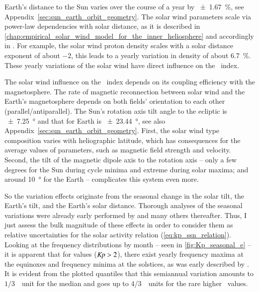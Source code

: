 Earth's distance to the Sun varies over the course of a year by \SI{+-1.67}{\percent}, see Appendix~\ref{sec:sun_earth_orbit_geometry}. The solar wind parameters scale via power-law dependencies with solar distance, as it is described in \autoref{chap:empirical_solar_wind_model_for_the_inner_heliosphere} and accordingly in \citet{Venzmer2018}. For example, the solar wind proton density scales with a solar distance exponent of about $-2$, this leads to a yearly variation in density of about \SI{6.7}{\percent}. These yearly variations of the solar wind have direct influence on the \Kp{}~index.

The solar wind influence on the \Kp{}~index depends on its coupling efficiency with the magnetosphere. The rate of magnetic reconnection between solar wind and the Earth's magnetosphere depends on both fields' orientation to each other (parallel/antiparallel). The Sun's rotation axis tilt angle to the ecliptic is \SI{+-7.25}{\degree} and that for Earth is \SI{+-23.44}{\degree}, see also Appendix~\ref{sec:sun_earth_orbit_geometry}. First, the solar wind type composition varies with heliographic latitude, which has consequences for the average values of parameters, such as magnetic field strength and velocity. Second, the tilt of the magnetic dipole axis to the rotation axis -- only a few degrees for the Sun during cycle minima and extreme during solar maxima; and around \SI{10}{\degree} for the Earth -- complicates this system even more.

So the \Kp{} variation effects originate from the seasonal change in the solar tilt, the Earth's tilt, and the Earth's solar distance. Thorough analyses of the seasonal variations were already early performed by \citet{Cortie1912} and many others thereafter. Thus, I just assess the bulk magnitude of these effects in order to consider them as relative uncertainties for the solar activity relation (\ref{eq:kp_ssn_relation}). Looking at the \Kp{} frequency distributions by month -- seen in \autoref{fig:Kp_seasonal_e} -- it is apparent that for values ($\textit{Kp}{} > 2$), there exist yearly frequency maxima at the equinoxes and frequency minima at the solstices, as was early described by \citet{Cortie1912}. It is evident from the plotted quantiles that this semiannual variation amounts to $1/3$~\Kp~unit for the median \Kp{} and goes up to 4/3~\Kp~units for the rare higher \Kp~values.


